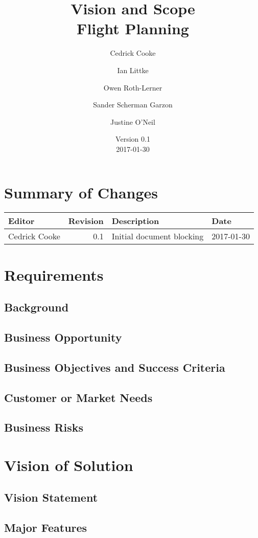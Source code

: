 \documentclass[12pt, letterpaper]{article}
\title{Vision and Scope \\
Flight Planning
}
\author{ Cedrick Cooke
    \and Ian Littke
    \and Owen Roth-Lerner
    \and Sander Scherman Garzon
    \and Justine O'Neil
}
\date{Version 0.1 \\ 2017-01-30}
\begin{document}
\maketitle

\tableofcontents

\section*{Summary of Changes}
\begin{tabularx}{\textwidth}{|l|r|X|l|}
\hline
Editor & Revision & Description & Date \\ \hline \hline
Cedrick Cooke & 0.1 & Initial document blocking & 2017-01-30 \\ \hline
\end{tabularx}

\section{Requirements}
\subsection{Background}
\subsection{Business Opportunity}
\subsection{Business Objectives and Success Criteria}
\subsection{Customer or Market Needs}
\subsection{Business Risks}

\section{Vision of Solution}
\subsection{Vision Statement}
\subsection{Major Features}
\end{document}
